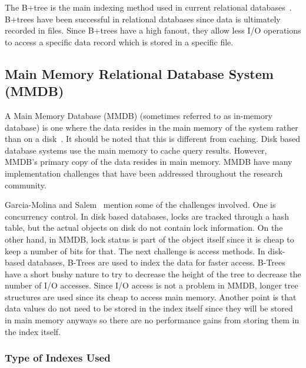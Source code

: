 \documentclass[12pt,a4paper]{article}
\begin{document}
The B+tree is the main indexing method used in current relational databases~\cite{lightstone2007physical}. B+trees have been successful in relational databases
since data is ultimately recorded in files. Since B+trees have a high fanout, they allow less I/O operations to access a specific data record which is stored in
a specific file.



\subsection{Main Memory Relational Database System (MMDB)}
\label{SEC-MMDB}

A Main Memory Database (MMDB) (sometimes referred to as in-memory database) is one where the data resides in the main memory of the system rather than on a
disk~\cite{garcia1992main}. It should be noted that this is different from caching. Disk based database systems use the main memory to cache query results.
However, MMDB's primary copy of the data resides in main memory. MMDB have many implementation challenges that have been addressed throughout the research
community.


Garcia-Molina and Salem~\cite{garcia1992main} mention some of the challenges involved. One is concurrency control. In disk based databases, locks are tracked
through a hash table, but the actual objects on disk do not contain lock information. On the other hand, in MMDB, lock status is part of the object itself since
it is cheap to keep a number of bits for that. The next challenge is access methods. In disk-based databases, B-Trees are used to index the data for faster
access. B-Trees have a short bushy nature to try to decrease the height of the tree to decrease the number of I/O accesses. Since I/O access is not a problem in
MMDB, longer tree structures are used since its cheap to access main memory. Another point is that data values do not need to be stored in the index itself
since they will be stored in main memory anyways so there are no performance gains from storing them in the index itself.


\subsubsection{Type of Indexes Used}
\end{document}
